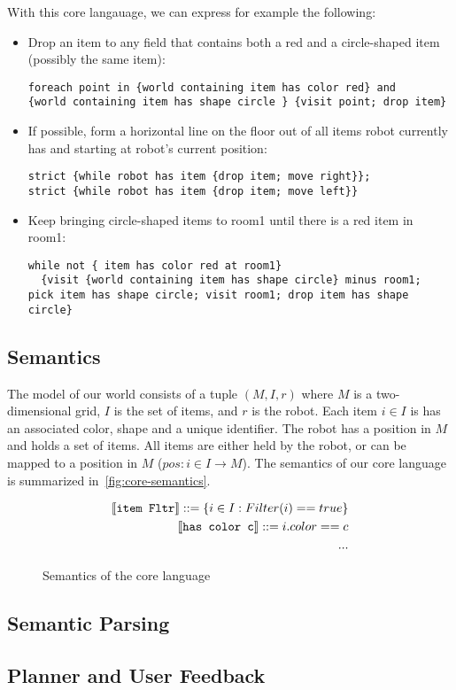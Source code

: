 With this core langauage, we can express for example the following:
\begin{itemize}
	\item Drop an item to any field that contains both a red and a circle-shaped item
    (possibly the same item):
    \begin{lstlisting}
foreach point in {world containing item has color red} and
{world containing item has shape circle } {visit point; drop item}
	   \end{lstlisting}

  \item If possible, form a horizontal line on the floor out of all items robot
    currently has and starting at robot's current position:
    \begin{lstlisting}
strict {while robot has item {drop item; move right}};
strict {while robot has item {drop item; move left}}
    \end{lstlisting}

	\item Keep bringing circle-shaped items to room1 until there is a red item in room1:
    \begin{lstlisting}
while not { item has color red at room1}
  {visit {world containing item has shape circle} minus room1;
pick item has shape circle; visit room1; drop item has shape circle}
    \end{lstlisting}
\end{itemize}


\subsection{Semantics}

The model of our world consists of a tuple $(M, I, r)$ where
$M$ is a two-dimensional grid, $I$ is the set of items, and $r$ is the robot.
Each item $i \in I$ is has an associated color, shape and a unique identifier.
The robot has a position in $M$ and holds a set of items. All items are either held by
the robot, or can be mapped to a position in $M$ ($pos: i \in I \to M$).
The semantics of our core language is summarized in~\autoref{fig:core-semantics}.
\begin{figure}
  \begin{align*}
  \llbracket \texttt{item Fltr}\rrbracket ::= \{i \in I: Filter(i) == true \} \\
  \llbracket \texttt{has color c}\rrbracket ::= i.color == c\\
  ...
  \end{align*}
  \caption{Semantics of the core language}
  \label{fig:core-semantics}
\end{figure}

\subsection{Semantic Parsing}

\subsection{Planner and User Feedback}

\cite{wangVoxelurn}


